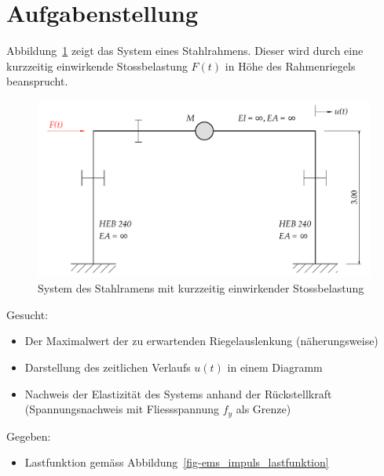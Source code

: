 \documentclass[
  letterpaper,
  DIV=11]{scrreprt}
\providecommand{\tightlist}{%
  \setlength{\itemsep}{0pt}\setlength{\parskip}{0pt}}\usepackage{longtable,booktabs,array}
\begin{document}
\hypertarget{aufgabenstellung-4}{%
\section{Aufgabenstellung}\label{aufgabenstellung-4}}

Abbildung~\ref{fig-ems_impuls_system} zeigt das System eines
Stahlrahmens. Dieser wird durch eine kurzzeitig einwirkende
Stossbelastung \(F(t)\) in Höhe des Rahmenriegels beansprucht.

\begin{figure}[H]

{\centering \includegraphics{index_files/mediabag/bilder/aufgabe_ems_impuls.pdf}

}

\caption{\label{fig-ems_impuls_system}System des Stahlramens mit
kurzzeitig einwirkender Stossbelastung}

\end{figure}

Gesucht:

\begin{itemize}
\tightlist
\item
  Der Maximalwert der zu erwartenden Riegelauslenkung (näherungsweise)
\item
  Darstellung des zeitlichen Verlaufs \(u(t)\) in einem Diagramm
\item
  Nachweis der Elastizität des Systems anhand der Rückstellkraft
  (Spannungsnachweis mit Fliessspannung \(f_y\) als Grenze)
\end{itemize}

Gegeben:

\begin{itemize}
\tightlist
\item
  Lastfunktion gemäss Abbildung~\ref{fig-ems_impuls_lastfunktion}
\end{itemize}
\end{document}
